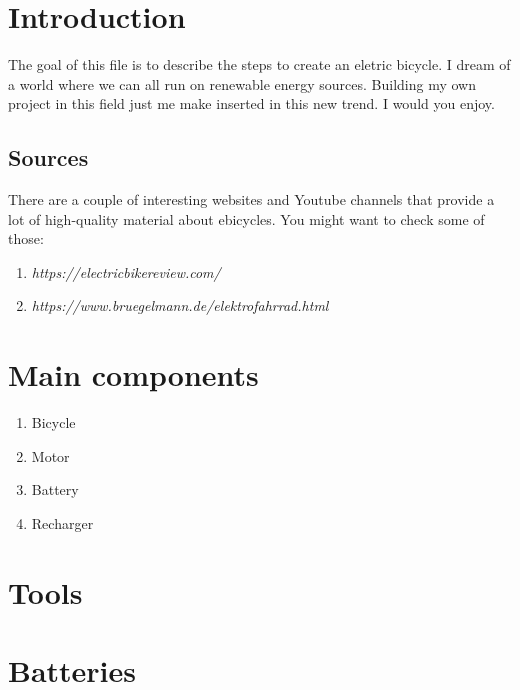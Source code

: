 



\tableofcontents
\newpage
\listoffigures
\newpage
\listoftables
\newpage
{}

\section{Introduction}
The goal of this file is to describe the steps to create an eletric bicycle. I dream of a world where we can all run on renewable energy sources. Building my own project in this field just me make inserted in this new trend. I would you enjoy.

\subsection{Sources}

There are a couple of interesting websites and Youtube channels that provide a lot of high-quality material about ebicycles. You might want to check some of those:

\begin{enumerate}
\item \textit{https://electricbikereview.com/}
\item \textit{https://www.bruegelmann.de/elektrofahrrad.html}
\end{enumerate}

\section{Main components}

\begin{enumerate}
\item Bicycle
\item Motor
\item Battery
\item Recharger

\end{enumerate}

\section{Tools}


\section{Batteries}

